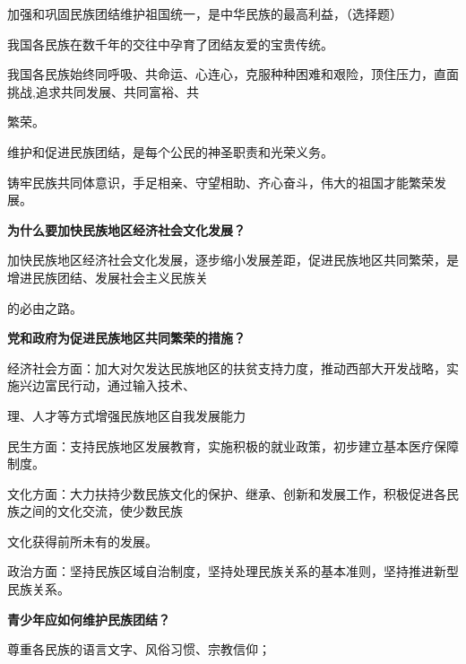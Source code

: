 \documentclass[lang=cn,11pt]{elegantbook}
\begin{document}
加强和巩固民族团结维护祖国统一，是中华民族的最高利益，（选择题）\par

我国各民族在数千年的交往中孕育了团结友爱的宝贵传统。\par

我国各民族始终同呼吸、共命运、心连心，克服种种困难和艰险，顶住压力，直面挑战,追求共同发展、共同富裕、共\par

繁荣。\par

维护和促进民族团结，是每个公民的神圣职责和光荣义务。\par

铸牢民族共同体意识，手足相亲、守望相助、齐心奋斗，伟大的祖国才能繁荣发展。\par

\textbf{为什么要加快民族地区经济社会文化发展？}\par

加快民族地区经济社会文化发展，逐步缩小发展差距，促进民族地区共同繁荣，是增进民族团结、发展社会主义民族关\par

的必由之路。\par

\textbf{党和政府为促进民族地区共同繁荣的措施？}\par

经济社会方面：加大对欠发达民族地区的扶贫支持力度，推动西部大开发战略，实施兴边富民行动，通过输入技术、\par

理、人才等方式增强民族地区自我发展能力\par

民生方面：支持民族地区发展教育，实施积极的就业政策，初步建立基本医疗保障制度。\par

文化方面：大力扶持少数民族文化的保护、继承、创新和发展工作，积极促进各民族之间的文化交流，使少数民族\par

文化获得前所未有的发展。\par

政治方面：坚持民族区域自治制度，坚持处理民族关系的基本准则，坚持推进新型民族关系。\par

\textbf{青少年应如何维护民族团结？}\par

尊重各民族的语言文字、风俗习惯、宗教信仰；\par
\end{document}
